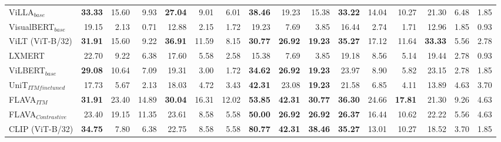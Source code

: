 \begin{table*}[!ht]
\begin{adjustbox}{max width=\textwidth}
\begin{tabular}{l|rrr|rrr|rrr|rrr|rrr}
 ViLLA$_{base}$               & \textbf{33.33} & 15.60          & 9.93           & \textbf{27.04} & 9.01           & 6.01           & \textbf{38.46} & 19.23          & 15.38          & \textbf{33.22} & 14.04          & 10.27          & 21.30          & 6.48           & 1.85           \\
 VisualBERT$_{base}$          & 19.15          & 2.13           & 0.71           & 12.88          & 2.15           & 1.72           & 19.23          & 7.69           & 3.85           & 16.44          & 2.74           & 1.71           & 12.96          & 1.85           & 0.93           \\
 ViLT (ViT-B/32)              & \textbf{31.91} & 15.60          & 9.22           & \textbf{36.91} & 11.59          & 8.15           & \textbf{30.77} & \textbf{26.92} & \textbf{19.23} & \textbf{35.27} & 17.12          & 11.64          & \textbf{33.33} & 5.56           & 2.78           \\
 LXMERT                       & 22.70          & 9.22           & 6.38           & 17.60          & 5.58           & 2.58           & 15.38          & 7.69           & 3.85           & 19.18          & 8.56           & 5.14           & 19.44          & 2.78           & 0.93           \\
 ViLBERT$_{base}$             & \textbf{29.08} & 10.64          & 7.09           & 19.31          & 3.00           & 1.72           & \textbf{34.62} & \textbf{26.92} & \textbf{19.23} & 23.97          & 8.90           & 5.82           & 23.15          & 2.78           & 1.85           \\
 UniT$_{ITM finetuned}$       & 17.73          & 5.67           & 2.13           & 18.03          & 4.72           & 3.43           & \textbf{42.31} & 23.08          & \textbf{19.23} & 21.58          & 6.85           & 4.11           & 13.89          & 4.63           & 3.70           \\
  FLAVA$_{ITM}$                & \textbf{31.91} & 23.40 & 14.89 & \textbf{30.04} & 16.31 & 12.02 & \textbf{53.85} & \textbf{42.31} & \textbf{30.77} & \textbf{36.30} & 24.66 & \textbf{17.81} & 21.30          & 9.26 & 4.63 \\
 FLAVA$_{Contrastive}$        & 23.40          & 19.15 & 11.35 & 23.61          &  8.58 &  5.58 & \textbf{50.00} & \textbf{26.92} & \textbf{26.92} & \textbf{26.37} & 16.44 & 10.62          & 22.22          &  5.56 & 4.63 \\
 CLIP (ViT-B/32)              & \textbf{34.75} & 7.80           & 6.38           & 22.75          & 8.58           & 5.58           & \textbf{80.77} & \textbf{42.31} & \textbf{38.46} & \textbf{35.27} & 13.01          & 10.27          & 18.52          & 3.70           & 1.85           \\

\end{tabular}
\end{adjustbox}
\end{table*}
